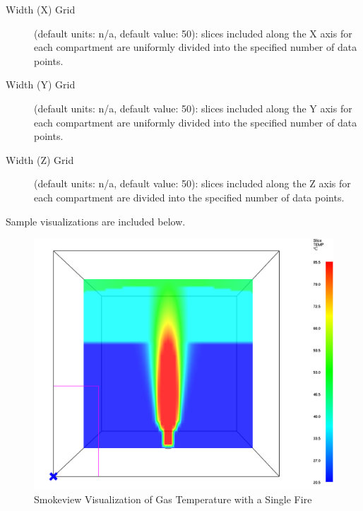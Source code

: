 \begin{description}
\item[Width (X) Grid] (default units: n/a, default value: 50): slices included along the X axis for each compartment are uniformly divided into the specified number of data points.

\item[Width (Y) Grid] (default units: n/a, default value: 50): slices included along the Y axis for each compartment are uniformly divided into the specified number of data points.

\item[Width (Z) Grid] (default units: n/a, default value: 50): slices included along the Z axis for each compartment are divided into the specified number of data points.
\end{description}

Sample visualizations are included below.

\begin{figure}[h!]
\begin{center}
\includegraphics[width=6.5in]{FIGURES/SMV_Temperature}
\caption{Smokeview Visualization of Gas Temperature with a Single Fire}
\end{center}
\end{figure}

